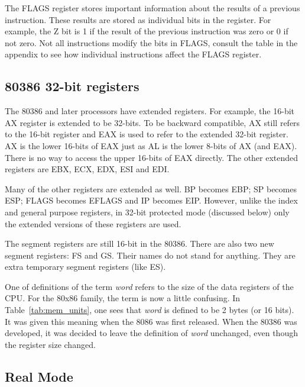 The FLAGS  register stores important information
about the results of a previous instruction. These results are stored
as individual bits in the register. For example, the Z bit is 1 if the
result of the previous instruction was zero or 0 if not zero. Not all
instructions modify the bits in FLAGS, consult the table in the
appendix to see how individual instructions affect the FLAGS register.

\subsection{80386 32-bit registers}

The 80386 and later processors have extended registers. For example, the
16-bit AX register is extended to be 32-bits. To be backward compatible, AX
still refers to the 16-bit register and EAX is used to refer to the extended
32-bit register. AX is the lower 16-bits of EAX just as AL is the lower 8-bits
of AX (and EAX). There is no way to access the upper 16-bits of EAX directly.
The other extended registers are EBX, ECX, EDX, ESI and EDI. 

Many of the other registers are extended as well. BP becomes
EBP; SP becomes ESP; FLAGS becomes EFLAGS and IP becomes
EIP. However, unlike the index and general purpose
registers, in 32-bit protected mode (discussed below) only the
extended versions of these registers are used.

The segment registers are still 16-bit in the 80386. There are also
two new segment registers: FS and GS. Their
names do not stand for anything. They are extra temporary segment
registers (like ES).

One of definitions of the term \emph{word}  refers to the
size of the data registers of the CPU. For the 80x86 family, the term
is now a little confusing. In Table~\ref{tab:mem_units}, one sees that
\emph{word} is defined to be 2 bytes (or 16 bits). It was given this
meaning when the 8086 was first released. When the 80386 was
developed, it was decided to leave the definition of \emph{word}
unchanged, even though the register size changed.

\subsection{Real Mode \label{real_mode} }

